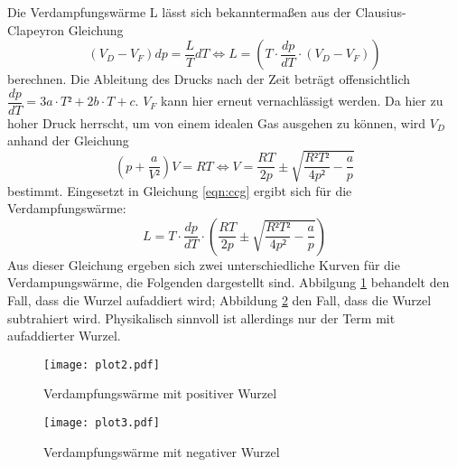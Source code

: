   Die Verdampfungswärme L lässt sich bekanntermaßen aus der Clausius-Clapeyron Gleichung 
  \begin{equation}
    \label{eqn:ccg}
    (V_D-V_F)dp = \dfrac{L}{T}dT \Leftrightarrow L = (T \cdot \dfrac{dp}{dT}\cdot(V_D-V_F)) 
  \end{equation}
  berechnen.
  Die Ableitung des Drucks nach der Zeit beträgt offensichtlich $\dfrac{dp}{dT}= 3a \cdot
  T²+2b\cdot T+ c$. $V_F$ kann hier erneut vernachlässigt werden.
  Da hier zu hoher Druck herrscht, um von einem idealen Gas ausgehen zu können, wird 
  $V_D$ anhand der Gleichung
  \begin{equation*}
  (p+\dfrac{a}{V²})V = RT \Leftrightarrow V = \dfrac{RT}{2p} \pm \sqrt{\dfrac{R²T²}{4p²}-\dfrac{a}{p}}
  \end{equation*}
  bestimmt. Eingesetzt in Gleichung \ref{eqn:ccg} ergibt sich für die Verdampfungswärme:
  \begin{equation*}
  L = T \cdot \dfrac{dp}{dT} \cdot (\dfrac{RT}{2p} \pm \sqrt{\dfrac{R²T²}{4p²}-\dfrac{a}{p}})
  \end{equation*}
  Aus dieser Gleichung ergeben sich zwei unterschiedliche Kurven für die Verdampungswärme, die
  Folgenden dargestellt sind. Abbilgung \ref{fig:plot2} behandelt den Fall, dass die Wurzel aufaddiert wird; 
  Abbildung \ref{fig:plot3} den Fall, dass die Wurzel subtrahiert wird. Physikalisch sinnvoll ist allerdings
  nur der Term mit aufaddierter Wurzel.
  \begin{figure}[H]
   \centering
   \texttt{[image: plot2.pdf]}
   \caption{Verdampfungswärme mit positiver Wurzel}
   \label{fig:plot2}
  \end{figure}
  
  \begin{figure}[H]
   \centering
   \texttt{[image: plot3.pdf]}
   \caption{Verdampfungswärme mit negativer Wurzel}
   \label{fig:plot3}
  \end{figure}

